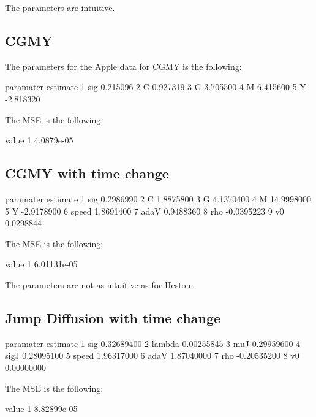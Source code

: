 \documentclass{article}
\begin{document}
The parameters are intuitive.

\subsection{CGMY}

The parameters for the Apple data for CGMY is the following:

\begin{Schunk}
\begin{Soutput}
  paramater  estimate
1       sig  0.215096
2         C  0.927319
3         G  3.705500
4         M  6.415600
5         Y -2.818320
\end{Soutput}
\end{Schunk}

The MSE is the following:

\begin{Schunk}
\begin{Soutput}
       value
1 4.0879e-05
\end{Soutput}
\end{Schunk}

\subsection{CGMY with time change}

\begin{Schunk}
\begin{Soutput}
  paramater   estimate
1       sig  0.2986990
2         C  1.8875800
3         G  4.1370400
4         M 14.9998000
5         Y -2.9178900
6     speed  1.8691400
7      adaV  0.9488360
8       rho -0.0395223
9        v0  0.0298844
\end{Soutput}
\end{Schunk}
The MSE is the following:

\begin{Schunk}
\begin{Soutput}
        value
1 6.01131e-05
\end{Soutput}
\end{Schunk}

The parameters are not as intuitive as for Heston.

\subsection{Jump Diffusion with time change}
\begin{Schunk}
\begin{Soutput}
  paramater    estimate
1       sig  0.32689400
2    lambda  0.00255845
3       muJ  0.29959600
4      sigJ  0.28095100
5     speed  1.96317000
6      adaV  1.87040000
7       rho -0.20535200
8        v0  0.00000000
\end{Soutput}
\end{Schunk}
The MSE is the following:

\begin{Schunk}
\begin{Soutput}
        value
1 8.82899e-05
\end{Soutput}
\end{Schunk}
\end{document}
